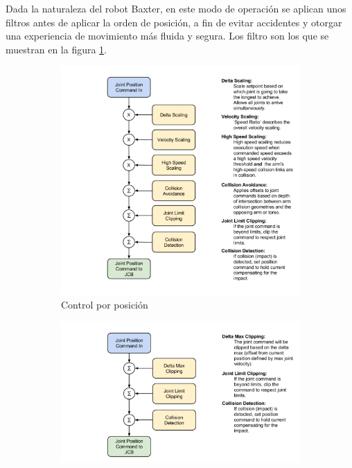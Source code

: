 Dada la naturaleza del robot Baxter, en este modo de operación se aplican unos filtros antes de aplicar la orden de posición, a fin de evitar accidentes y otorgar una experiencia de movimiento más fluida y segura. Los filtro son los que se muestran en la figura \ref{fig:desarrollo/position_filters}.

\begin{figure}[]
	\centering
	\begin{subfigure}[b]{0.24\textwidth}
		\includegraphics[trim=0 0 235 0, clip, width=\textwidth]{imagenes/desarrollo/baxter_position_filters.png}
		\caption{Control por posición}
		\label{fig:desarrollo/position_filters}
	\end{subfigure}
	\begin{subfigure}[b]{0.24\textwidth}
		\centering
		\includegraphics[trim=0 0 230 0, clip, width=\textwidth]{imagenes/desarrollo/baxter_position_raw_filters.png}

\end{subfigure}
\end{figure}
